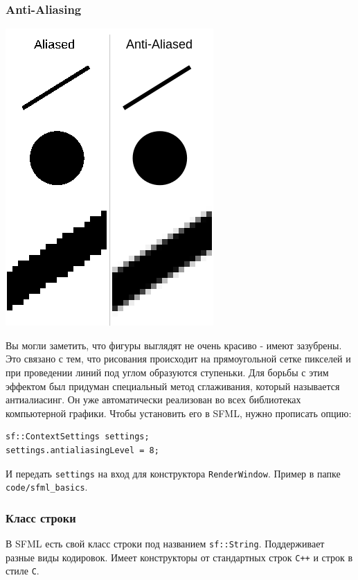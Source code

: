 \documentclass{article}
\begin{document}
\subsubsection*{Anti-Aliasing}
\begin{multicols}{2}
\begin{center}
\includegraphics[scale=0.5]{../images/anti-aliasing.png}
\end{center}
Вы могли заметить, что фигуры выглядят не очень красиво - имеют зазубрены. Это связано с тем, что рисования происходит на прямоугольной сетке пикселей и при проведении линий под углом образуются ступеньки. Для борьбы с этим эффектом был придуман специальный метод сглаживания, который называется антиалиасинг. Он уже автоматически реализован во всех библиотеках компьютерной графики. Чтобы установить его в SFML, нужно прописать опцию:
\begin{lstlisting}
sf::ContextSettings settings;
settings.antialiasingLevel = 8;
\end{lstlisting}
И передать \texttt{settings} на вход для конструктора \texttt{RenderWindow}. Пример в папке \texttt{code/sfml\_basics}.
\end{multicols}


\subsubsection*{Класс строки}
В SFML есть свой класс строки под названием \texttt{sf::String}. Поддерживает разные виды кодировок. Имеет конструкторы от стандартных строк \texttt{C++} и строк в стиле \texttt{C}.
\end{document}
